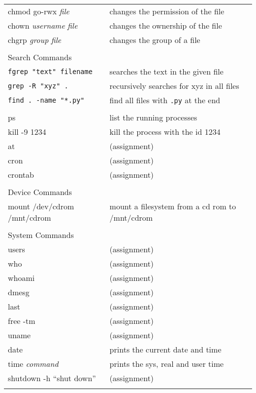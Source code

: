 \begin{center}
\begin{longtable}{|p{4cm}|p{8cm}|}
  chmod go-rwx \textit{file} & changes the permission of the file \\
  chown \textit{username} \textit{file} & changes the ownership of the file \\
  chgrp \textit{group} \textit{file} & changes the group of a file\\
  & \\

  \hline
  \multicolumn{2}{|l|}{\cellcolor{blue!15} Search Commands}\\
  \hline
  \verb|fgrep "text" filename| &  searches the text in the given file \\
  \verb|grep -R "xyz" .| & recursively searches for xyz in all files \\
  \verb|find . -name "*.py"| &  find all files with \verb|.py| at the end \\
  & \\

  ps & list the running processes \\
  kill -9 1234 & kill the process with the id 1234 \\
  at &  (assignment) \\
  cron &  (assignment) \\
  crontab &  (assignment) \\
  & \\

  \hline
  \multicolumn{2}{|l|}{\cellcolor{blue!15} Device Commands}\\
  \hline
  mount /dev/cdrom /mnt/cdrom & mount a filesystem from a cd rom to /mnt/cdrom\\
  & \\

  \hline
  \multicolumn{2}{|l|}{\cellcolor{blue!15} System Commands}\\
  \hline
  users &  (assignment) \\
  who &  (assignment) \\
  whoami &  (assignment) \\
  dmesg &  (assignment) \\
  last &  (assignment) \\
  free -tm &  (assignment) \\
  uname &  (assignment) \\
  date &  prints the current date and time \\
  time \textit{command} &  prints the sys, real and user time \\
  shutdown -h ``shut down'' & (assignment) \\
  & \\


\end{longtable}
\end{center}
